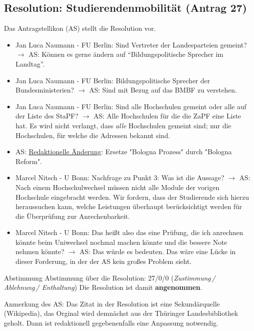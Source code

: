   \subsection*{Resolution: Studierendenmobilität (Antrag 27)}
    Das Antragstellikon (AS) stellt die Resolution vor.
    \begin{itemize}
      \item Jan Luca Naumann - FU Berlin:  Sind Vertreter der Landesparteien gemeint?
        $\rightarrow$ AS: Können es gerne ändern auf ``Bildungspolitische Sprecher im Landtag''.
      \item Jan Luca Naumann - FU Berlin:  Bildungspolitische Sprecher der Bundesministerien?
        $\rightarrow$ AS: Sind mit Bezug auf das BMBF zu verstehen.
      \item Jan Luca Naumann - FU Berlin:  Sind alle Hochschulen gemeint oder alle auf der Liste des StaPF?
        $\rightarrow$ AS: Alle Hochschulen für die die ZaPF eine Liste hat. Es wird nicht verlangt, dass \textit{alle} Hochschulen gemeint sind; nur die Hochschulen, für welche die Adressen bekannt sind.
      \item AS: \uline{Redaktionelle Änderung}: Ersetze "Bologna Prozess" durch "Bologna Reform".
      \item Marcel Nitsch - U Bonn:  Nachfrage zu Punkt 3: Was ist die Aussage?
        $\rightarrow$ AS: Nach einem Hochschulwechsel müssen nicht alle Module der vorigen Hochschule eingebracht werden. Wir fordern, dass der Studierende sich hierzu heraussuchen kann, welche Leistungen überhaupt berücksichtigt werden für die Überprüfung zur Anrechenbarkeit.
      \item Marcel Nitsch - U Bonn:  Das heißt also das eine Prüfung, die ich anrechnen könnte beim Uniwechsel nochmal machen könnte und die bessere Note nehmen könnte?
        $\rightarrow$ AS: Das würde es bedeuten. Das wäre eine Lücke in dieser Forderung, in der der AS kein großes Problem sieht.
    \end{itemize}

    \begin{success}{Abstimmung}
      Abstimmung über die Resolution: 27/0/0 (\textit{Zustimmung\,/ Ablehnung\,/ Enthaltung})
      Die Resolution ist damit \textbf{angenommen}.
    \end{success}

    Anmerkung des AS: Das Zitat in der Resolution ist eine Sekundärquelle (Wikipedia), das Orginal wird demnächst aus der Thüringer Landesbibliothek geholt. Dann ist redaktionell gegebenenfalls eine Anpassung notwendig.

